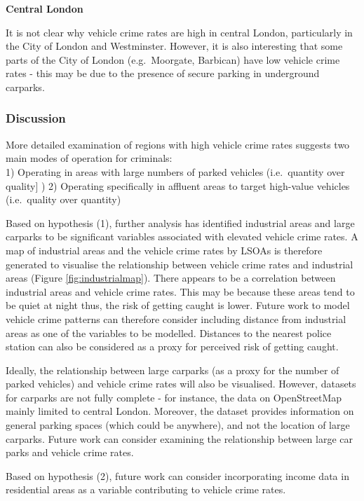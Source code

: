 \documentclass[]{article}
\theoremstyle{definition}
\theoremstyle{definition}
\theoremstyle{definition}
\theoremstyle{remark}
\begin{document}
\textbf{Central London}

It is not clear why vehicle crime rates are high in central London,
particularly in the City of London and Westminster. However, it is also
interesting that some parts of the City of London (e.g.~Moorgate,
Barbican) have low vehicle crime rates - this may be due to the presence
of secure parking in underground carparks.

\subsubsection{Discussion}\label{discussion}

More detailed examination of regions with high vehicle crime rates
suggests two main modes of operation for criminals:\\
1) Operating in areas with large numbers of parked vehicles
(i.e.~quantity over quality{]} ) 2) Operating specifically in affluent
areas to target high-value vehicles (i.e.~quality over quantity)

Based on hypothesis (1), further analysis has identified industrial
areas and large carparks to be significant variables associated with
elevated vehicle crime rates. A map of industrial areas and the vehicle
crime rates by LSOAs is therefore generated to visualise the
relationship between vehicle crime rates and industrial areas (Figure
\ref{fig:industrialmap}). There appears to be a correlation between
industrial areas and vehicle crime rates. This may be because these
areas tend to be quiet at night thus, the risk of getting caught is
lower. Future work to model vehicle crime patterns can therefore
consider including distance from industrial areas as one of the
variables to be modelled. Distances to the nearest police station can
also be considered as a proxy for perceived risk of getting caught.

Ideally, the relationship between large carparks (as a proxy for the
number of parked vehicles) and vehicle crime rates will also be
visualised. However, datasets for carparks are not fully complete - for
instance, the data on OpenStreetMap mainly limited to central London.
Moreover, the dataset provides information on general parking spaces
(which could be anywhere), and not the location of large carparks.
Future work can consider examining the relationship between large car
parks and vehicle crime rates.

Based on hypothesis (2), future work can consider incorporating income
data in residential areas as a variable contributing to vehicle crime
rates.
\end{document}
